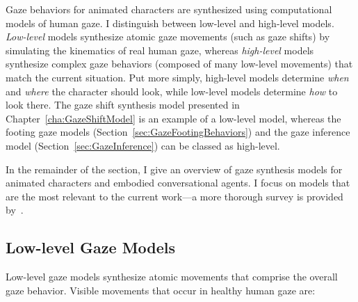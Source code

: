 Gaze behaviors for animated characters are synthesized using computational models of human gaze. I distinguish between low-level and high-level models. \emph{Low-level} models synthesize atomic gaze movements (such as gaze shifts) by simulating the kinematics of real human gaze, whereas \emph{high-level} models synthesize complex gaze behaviors (composed of many low-level movements) that match the current situation. Put more simply, high-level models determine \emph{when} and \emph{where} the character should look, while low-level models determine \emph{how} to look there. The gaze shift synthesis model presented in Chapter~\ref{cha:GazeShiftModel} is an example of a low-level model, whereas the footing gaze models (Section~\ref{sec:GazeFootingBehaviors}) and the gaze inference model (Section~\ref{sec:GazeInference}) can be classed as high-level.

In the remainder of the section, I give an overview of gaze synthesis models for animated characters and embodied conversational agents. I focus on models that are the most relevant to the current work---a more thorough survey is provided by~\citet{ruhland2015gazereview}.

\subsection{Low-level Gaze Models}

Low-level gaze models synthesize atomic movements that comprise the overall gaze behavior. Visible movements that occur in healthy human gaze are:

